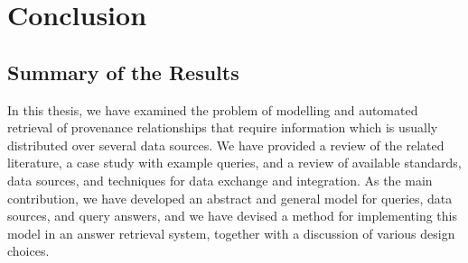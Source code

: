\chapter{Conclusion}
\label{chap:conclusion}

\section{Summary of the Results}
\label{sec:summary}

In this thesis, we have examined the problem of modelling and automated retrieval of provenance relationships
that require information which is usually distributed over several data sources.
We have provided a review of the related literature,
a case study with example queries, and a review of available standards, data sources,
and techniques for data exchange and integration.
As the main contribution, we have developed an abstract and general model for queries,
data sources, and query answers, and we have devised a method for implementing this model
in an answer retrieval system, together with a discussion of various design choices.

